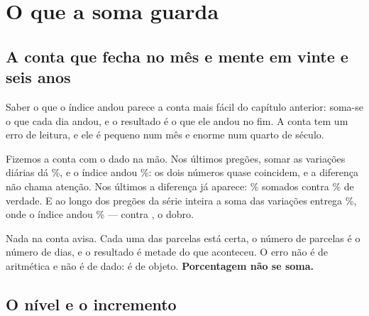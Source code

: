 %
%

\chapter{O que a soma guarda}
\label{cap:soma}

\section{A conta que fecha no mês e mente em vinte e seis anos}

Saber o que o índice andou parece a conta mais fácil do capítulo anterior: soma-se o que cada
dia andou, e o resultado é o que ele andou no fim. A conta tem um erro de leitura, e ele é
pequeno num mês e enorme num quarto de século.

Fizemos a conta com o dado na mão. Nos últimos \numSomaCurtaDias{} pregões, somar as variações
diárias dá \numSomaCurtaVariacoesPct\%, e o índice andou \numSomaCurtaRealPct\%: os dois
números quase coincidem, e a diferença não chama atenção. Nos últimos \numSomaLongaDias{} a
diferença já aparece: \numSomaLongaVariacoesPct\% somados contra \numSomaLongaRealPct\% de
verdade. E ao longo dos \numSomaSerieDias{} pregões da série inteira a soma das variações
entrega \numSomaVariacoesPct\%, onde o índice andou \numSomaVariacaoRealPct\% ---
\numSomaVariacaoRealPct{} contra \numSomaVariacoesPct{}, o dobro.

Nada na conta avisa. Cada uma das parcelas está certa, o número de parcelas é o número de dias,
e o resultado é metade do que aconteceu. O erro não é de aritmética e não é de dado: é de
objeto. \textbf{Porcentagem não se soma.}

\section{O nível e o incremento}

